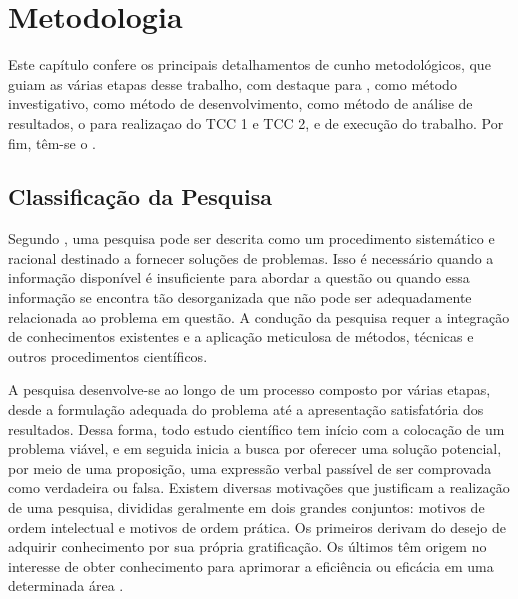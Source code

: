 \chapter{Metodologia}
    \label{chap:Metodologia}

Este capítulo confere os principais detalhamentos de cunho metodológicos, que guiam as várias etapas desse trabalho, com destaque para ,  como método investigativo,  como método de desenvolvimento,  como método de análise de resultados, o  para realizaçao do TCC 1 e TCC 2, e  de execução do trabalho. Por fim, têm-se o .




\section{Classificação da Pesquisa}
    \label{ClassificacaoPesquisa}

Segundo \cite{ProjPesquisaGil}, uma pesquisa pode ser descrita como um procedimento sistemático e racional destinado a fornecer soluções de problemas. Isso é necessário quando a informação disponível é insuficiente para abordar a questão ou quando essa informação se encontra tão desorganizada que não pode ser adequadamente relacionada ao problema em questão. A condução da pesquisa requer a integração de conhecimentos existentes e a aplicação meticulosa de métodos, técnicas e outros procedimentos científicos. 

A pesquisa desenvolve-se ao longo de um processo composto por várias etapas, desde a formulação adequada do problema até a apresentação satisfatória dos resultados. Dessa forma, todo estudo científico tem início com a colocação de um problema viável, e em seguida inicia a busca por oferecer uma solução potencial, por meio de uma proposição, uma expressão verbal passível de ser comprovada como verdadeira ou falsa. Existem diversas motivações que justificam a realização de uma pesquisa, divididas geralmente em dois grandes conjuntos: motivos de ordem intelectual e motivos de ordem prática. Os primeiros derivam do desejo de adquirir conhecimento por sua própria gratificação. Os últimos têm origem no interesse de obter conhecimento para aprimorar a eficiência ou eficácia em uma determinada área \cite{ProjPesquisaGil}.

